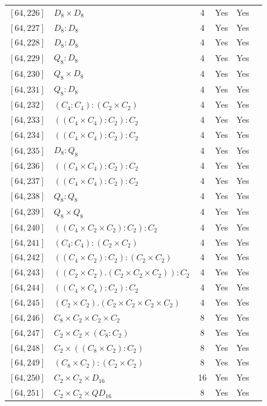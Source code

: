 \documentclass[12pt, a4paper]{article}
\theoremstyle{plain}
\theoremstyle{definition}
\begin{document}
\begin{longtable}{llcccl}
  $[64,226]$ & $D_8 \times D_8$ & 4 & Yes & Yes \\
  $[64,227]$ & $D_8 : D_8$ & 4 & Yes & Yes \\
  $[64,228]$ & $D_8 : D_8$ & 4 & Yes & Yes \\
  $[64,229]$ & $Q_8 : D_8$ & 4 & Yes & Yes \\
  $[64,230]$ & $Q_8 \times D_8$ & 4 & Yes & Yes \\
  $[64,231]$ & $Q_8 : D_8$ & 4 & Yes & Yes \\
  $[64,232]$ & $(C_4 : C_4) : (C_2 \times C_2)$ & 4 & Yes & Yes \\
  $[64,233]$ & $((C_4 \times C_4) : C_2) : C_2$ & 4 & Yes & Yes \\
  $[64,234]$ & $((C_4 \times C_4) : C_2) : C_2$ & 4 & Yes & Yes \\
  $[64,235]$ & $D_8 : Q_8$ & 4 & Yes & Yes \\
  $[64,236]$ & $((C_4 \times C_4) : C_2) : C_2$ & 4 & Yes & Yes \\
  $[64,237]$ & $((C_4 \times C_4) : C_2) : C_2$ & 4 & Yes & Yes \\
  $[64,238]$ & $Q_8 : Q_8$ & 4 & Yes & Yes \\
  $[64,239]$ & $Q_8 \times Q_8$ & 4 & Yes & Yes \\
  $[64,240]$ & $((C_4 \times C_2 \times C_2) : C_2) : C_2$ & 4 & Yes & Yes \\
  $[64,241]$ & $(C_4 : C_4) : (C_2 \times C_2)$ & 4 & Yes & Yes \\
  $[64,242]$ & $((C_4 \times C_2) : C_2) : (C_2 \times C_2)$ & 4 & Yes & Yes \\
  $[64,243]$ & $((C_2 \times C_2) . (C_2 \times C_2 \times C_2)) : C_2$ & 4 & Yes & Yes \\
  $[64,244]$ & $((C_4 \times C_4) : C_2) : C_2$ & 4 & Yes & Yes \\
  $[64,245]$ & $(C_2 \times C_2) . (C_2 \times C_2 \times C_2 \times C_2)$ & 4 & Yes & Yes \\
  $[64,246]$ & $C_8 \times C_2 \times C_2 \times C_2$ & 8 & Yes & Yes \\
  $[64,247]$ & $C_2 \times C_2 \times (C_8 : C_2)$ & 8 & Yes & Yes \\
  $[64,248]$ & $C_2 \times ((C_8 \times C_2) : C_2)$ & 8 & Yes & Yes \\
  $[64,249]$ & $(C_8 \times C_2) : (C_2 \times C_2)$ & 8 & Yes & Yes \\
  $[64,250]$ & $C_2 \times C_2 \times D_{16}$ & 16 & Yes & Yes \\
  $[64,251]$ & $C_2 \times C_2 \times QD_{16}$ & 8 & Yes & Yes \\

\end{longtable}
\end{document}
